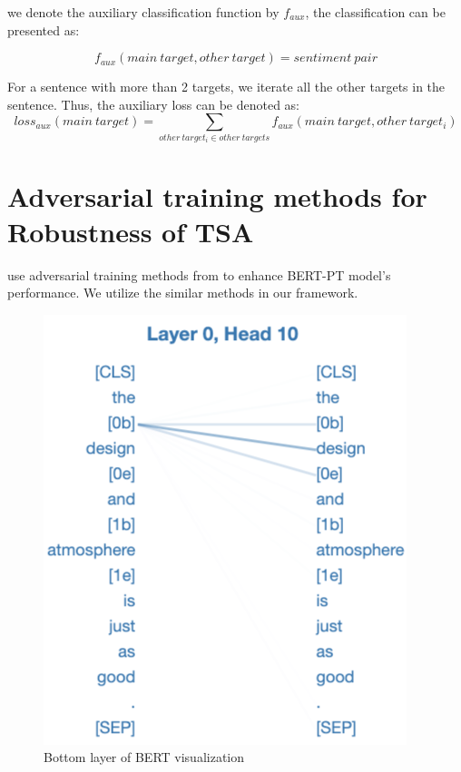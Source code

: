 \documentclass[fyp]{socreport}
\begin{document}
we denote the auxiliary classification function by $f_{aux}$, the classification can be presented as:  

\begin{equation}
    f_{aux}(main\ target,other\ {target})=sentiment\ {pair}
\end{equation}

For a sentence with more than 2 targets, we iterate all the other targets in the sentence. Thus, the auxiliary loss can be denoted as:  
\begin{equation}
    loss_{aux}(main\ target)=\sum_{other\ {target_i} \in other\ {targets} }f_{aux}(main\ target,other\ {target_i})
\end{equation}





\section{Adversarial training methods for Robustness of TSA}
\cite{karimi2020adversarial} use adversarial training methods from \cite{miyato2016adversarial} to enhance BERT-PT\cite{xu2019bert} model's performance. We utilize the similar methods in our framework.

\begin{figure}[h]
    \centering
    \includegraphics[width=\linewidth]{./image/target-depence.png}
    \caption{Bottom layer of BERT visualization}
  \label{target-depence}
\end{figure}
\end{document}
